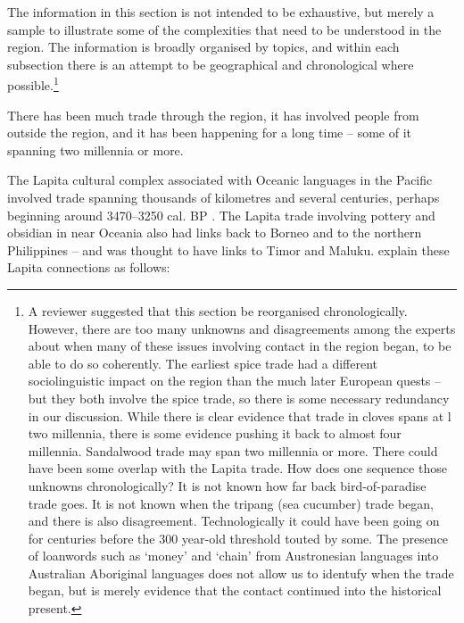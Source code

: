 
The information in this section is not intended to be exhaustive,
but merely a sample to illustrate some of the complexities that
need to be understood in the region.
The information is broadly organised by topics,
and within each subsection there is an attempt to be geographical
and chronological where possible.\footnote{
		A reviewer suggested that this section be reorganised chronologically.
		However, there are too many unknowns
		and disagreements among the experts about when many of these
		issues involving contact in the region began,
		to be able to do so coherently.
		The earliest spice trade had a different sociolinguistic
		impact on the region than the much later European quests -- but
		they both involve the spice trade,
		so there is some necessary redundancy in our discussion.
		While there is clear evidence that trade in cloves spans at l
		two millennia, there is some evidence pushing it back to almost four millennia.
		Sandalwood trade may span two millennia or more.
		There could have been some overlap with the Lapita trade.
		How does one sequence those unknowns chronologically?
		It is not known how far back bird-of-paradise trade goes.
		It is not known when the tripang (sea cucumber) trade began,
		and there is also disagreement.
		Technologically it could have been going on for centuries before
		the 300 year-old threshold touted by some.
		The presence of loanwords such as ‘money’
		and ‘chain’ from Austronesian languages into Australian Aboriginal
		languages does not allow us to identufy when the trade began,
		but is merely evidence that the contact continued into
		the historical present.}

There has been much trade through the region,
it has involved people from outside the region,
and it has been happening for a long time -- some of it spanning two millennia or more.

The Lapita cultural complex associated with Oceanic languages in the Pacific involved
trade spanning thousands of kilometres
and several centuries, perhaps beginning around 3470--3250 cal.
BP \citep[95]{SpechtTerrell2014}.
The Lapita trade involving pottery
and obsidian in near Oceania also had links back to Borneo
and to the northern Philippines -- and was thought to have links to Timor and Maluku.
\citet{SpechtTerrell2014} explain these Lapita connections as follows:

